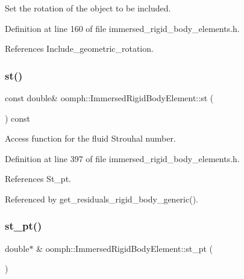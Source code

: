 Set the rotation of the object to be included. 



Definition at line 160 of file immersed\+\_\+rigid\+\_\+body\+\_\+elements.\+h.



References Include\+\_\+geometric\+\_\+rotation.

\mbox{\label{classoomph_1_1ImmersedRigidBodyElement_a872d911b5a42dae2b2d1463a9a381bb2}} 
\subsubsection{\texorpdfstring{st()}{st()}}
{\footnotesize\ttfamily const double\& oomph\+::\+Immersed\+Rigid\+Body\+Element\+::st (\begin{DoxyParamCaption}{ }\end{DoxyParamCaption}) const\hspace{0.3cm}{\ttfamily [inline]}}



Access function for the fluid Strouhal number. 



Definition at line 397 of file immersed\+\_\+rigid\+\_\+body\+\_\+elements.\+h.



References St\+\_\+pt.



Referenced by get\+\_\+residuals\+\_\+rigid\+\_\+body\+\_\+generic().

\mbox{\label{classoomph_1_1ImmersedRigidBodyElement_a2f57a2105a0bb176daaa634b100801fa}} 
\subsubsection{\texorpdfstring{st\+\_\+pt()}{st\_pt()}}
{\footnotesize\ttfamily double$\ast$ \& oomph\+::\+Immersed\+Rigid\+Body\+Element\+::st\+\_\+pt (\begin{DoxyParamCaption}{ }\end{DoxyParamCaption})\hspace{0.3cm}{\ttfamily [inline]}}



